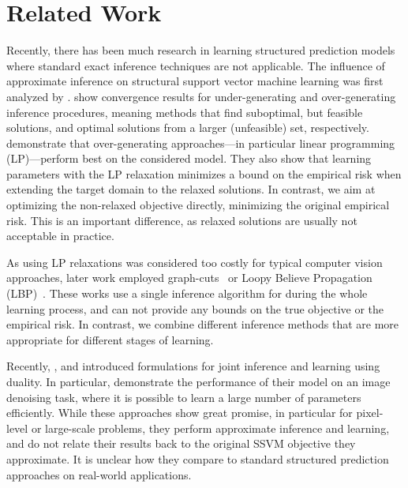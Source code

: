 \section{Related Work}



Recently, there has been much research in learning structured prediction models
where standard exact inference techniques are not applicable.
The influence of approximate inference on structural support vector machine
learning was first analyzed by  \citet{finley2008training}.
\citet{finley2008training} show convergence results for under-generating and
over-generating inference procedures, meaning methods that find suboptimal, but
feasible solutions, and optimal solutions from a larger (unfeasible) set,
respectively.
\citet{finley2008training} demonstrate that over-generating approaches---in
particular linear programming (LP)---perform best on the considered model.
They also show that learning parameters with the LP relaxation minimizes a
bound on the empirical risk when extending the target domain to the relaxed
solutions.
In contrast, we aim at optimizing the non-relaxed objective directly, minimizing
the original empirical risk. This is an important difference, as relaxed solutions
are usually not acceptable in practice.

As using LP relaxations was considered too costly for typical computer vision
approaches, later work employed graph-cuts~\citep{szummer2008learning} or Loopy
Believe Propagation (LBP)~\citep{lucchi2011spatial}. These works use a single
inference algorithm for during the whole learning process, and can not provide any
bounds on the true objective or the empirical risk. In contrast, we combine
different inference methods that are more appropriate for different stages of
learning.

Recently, \citet{meshi2010learning}, \citet{hazan2010primal} and
\citet{komodakis2011efficient} introduced formulations for joint inference and
learning using duality.
In particular, \citet{hazan2010primal} demonstrate the performance of their
model on an image denoising task, where it is possible to learn a large number
of parameters efficiently.
While these approaches show great promise, in particular for pixel-level or
large-scale problems, they perform approximate inference and learning, and do
not relate their results back to the original SSVM objective they approximate.
It is unclear how they compare to standard structured prediction approaches
on real-world applications.



